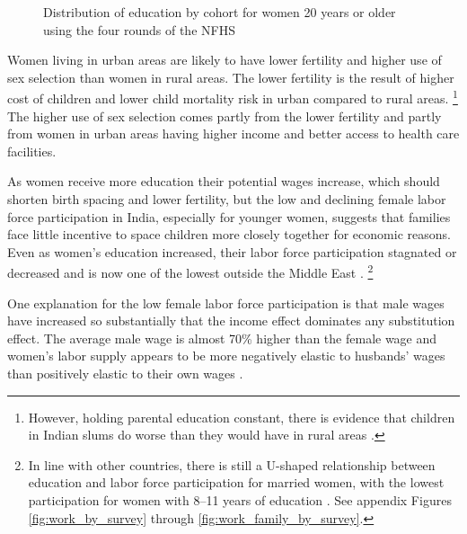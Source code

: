 \begin{figure}[htpb]
\centering
{} 
\caption{Distribution of education by cohort for women 20 years or older
using the four rounds of the NFHS}
\label{fig:education_over_time}
\end{figure}


Women living in urban areas are likely to have lower fertility and higher use
of sex selection than women in rural areas.
The lower fertility is the result of higher cost of children and lower child mortality 
risk in urban compared to rural areas.%
\footnote{
However, holding parental education constant, there is evidence that children in
Indian slums do worse than they would have in rural areas \citep{Portner2018a}.
}
The higher use of sex selection comes partly from the lower fertility and partly from 
women in urban areas having higher income and better access to health care facilities.


As women receive more education their potential wages increase, which should shorten 
birth spacing and lower fertility, but the low and declining female labor force 
participation in India, especially for younger women, suggests that families face little 
incentive to space children more closely together for economic reasons.
Even as women's education increased, their labor force participation stagnated or 
decreased and is now one of the lowest outside the Middle East 
\citep{Klasen2015,Fletcher2017,Afridi2018,Bhargava2018,Chatterjee2018}.%
\footnote{
In line with other countries, there is still a U-shaped relationship between education and 
labor force participation for married women, with the lowest participation for 
women with 8--11 years of education \citep{Goldin1994,Chatterjee2018}.
See appendix Figures \ref{fig:work_by_survey} through \ref{fig:work_family_by_survey}. 
}

One explanation for the low female labor force participation is that male wages have 
increased so substantially that the income effect dominates any substitution effect.
The average male wage is almost 70\% higher than the female wage and women’s labor 
supply appears to be more negatively elastic to husbands' wages than positively elastic 
to their own wages \citep{Klasen2015,Bhargava2018}.

